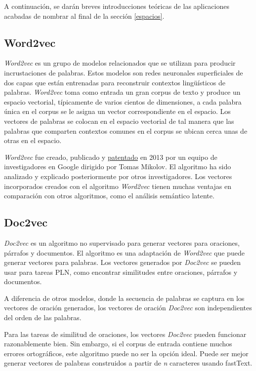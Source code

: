 \documentclass[titlepage]{article}
\begin{document}
	A continuación, se darán breves introducciones teóricas de las aplicaciones acabadas de nombrar al final de la sección \ref{espacios}.
	
	\subsection{Word2vec}
	
	\textit{Word2vec}\cite{word2vec} es un grupo de modelos relacionados que se utilizan para producir incrustaciones de palabras. Estos modelos son redes neuronales superficiales de dos capas que están entrenadas para reconstruir contextos lingüísticos de palabras. \textit{Word2vec} toma como entrada un gran corpus de texto y produce un espacio vectorial, típicamente de varios cientos de dimensiones, a cada palabra única en el corpus se le asigna un vector correspondiente en el espacio. Los vectores de palabras se colocan en el espacio vectorial de tal manera que las palabras que comparten contextos comunes en el corpus se ubican cerca unas de otras en el espacio. 
	
	\textit{Word2vec} fue creado, publicado y \href{https://patents.google.com/patent/US9037464B1/en}{patentado} en 2013 por un equipo de investigadores en Google dirigido por Tomas Mikolov. El algoritmo ha sido analizado y explicado posteriormente por otros investigadores. Los vectores incorporados creados con el algoritmo \textit{Word2vec} tienen muchas ventajas en comparación con otros algoritmos, como el análisis semántico latente.
	
	\subsection{Doc2vec}
	
	\textit{Doc2vec}\cite{doc2vec} es un algoritmo no supervisado para generar vectores para oraciones, párrafos y documentos. El algoritmo es una adaptación de \textit{Word2vec} que puede generar vectores para palabras. Los vectores generados por \textit{Doc2vec} se pueden usar para tareas PLN, como encontrar similitudes entre oraciones, párrafos y documentos.
	
	A diferencia de otros modelos, donde la secuencia de palabras se captura en los vectores de oración generados, los vectores de oración \textit{Doc2vec} son independientes del orden de las palabras.
	
	Para las tareas de similitud de oraciones, los vectores \textit{Doc2vec} pueden funcionar razonablemente bien. Sin embargo, si el corpus de entrada contiene muchos errores ortográficos, este algoritmo puede no ser la opción ideal. Puede ser mejor generar vectores de palabras construidos a partir de \textit{n} caracteres usando fastText. 
	
\end{document}
